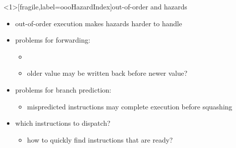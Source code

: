 \usetikzlibrary{arrows.meta,matrix}

\begin{frame}<1>[fragile,label=oooHazardIndex]{out-of-order and hazards}
    \begin{itemize}
    \item out-of-order execution makes hazards harder to handle
    \vspace{.5cm}
    \item problems for forwarding:
    \begin{itemize}
        \item {}
        \item older value may be written back before newer value?
    \end{itemize}
    \item problems for branch prediction:
    \begin{itemize}
        \item mispredicted instructions may complete execution before squashing
    \end{itemize}
    \item which instructions to dispatch?
        \begin{itemize}
        \item how to quickly find instructions that are ready?
        \end{itemize}
    \end{itemize}
\end{frame}


